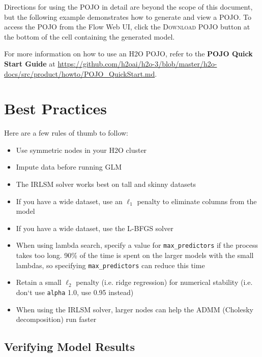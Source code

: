 Directions for using the POJO in detail are beyond the scope of this document, but the following example demonstrates how to generate and view a POJO.  To access the POJO from the Flow Web UI, click the \textsc{Download POJO} button at the bottom of the cell containing the generated model.

For more information on how to use an H2O POJO, refer to the \textbf{POJO Quick Start Guide} at {\url{https://github.com/h2oai/h2o-3/blob/master/h2o-docs/src/product/howto/POJO_QuickStart.md}}. 

\waterExampleInR

\newpage
\waterExampleInPython



\section{Best Practices}

Here are a few rules of thumb to follow:

\begin{itemize}
\item Use symmetric nodes in your H2O cluster
\item Impute data before running GLM
\item The IRLSM solver works best on tall and skinny datasets
\item If you have a wide dataset, use an  $\ell_1$ penalty to eliminate columns from the model
\item If you have a wide dataset, use the L-BFGS solver
\item When using lambda search, specify a value for \texttt{max\_predictors} if the process takes too long. 90\% of the time is spent on the larger models with the small lambdas, so specifying \texttt{max\_predictors} can reduce this time
\item Retain a small  $\ell_2$ penalty (i.e. ridge regression) for numerical stability (i.e. don`t use \texttt{alpha} 1.0, use 0.95 instead)
\item When using the IRLSM solver, larger nodes can help the ADMM (Cholesky decomposition) run faster
\end{itemize}

\newpage
\subsection{Verifying Model Results}

